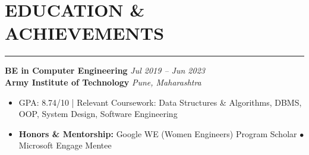 \documentclass[11pt,letterpaper]{article}
\newcommand{\sectionrule}{\vspace{-6pt}\hrule\vspace{3pt}}
\newcommand{\entryHeader}[4]{%
  \textbf{#1} \hfill \textit{#2}\\
  \textbf{#3} \hfill \textit{#4}
}
\newenvironment{entryList}{%
  \begin{itemize}[leftmargin=1.3em, itemsep=1.5pt, topsep=2pt, parsep=0pt]
}{%
  \end{itemize}\vspace{2pt}
}
\begin{document}
\section*{EDUCATION \& ACHIEVEMENTS}
\sectionrule

\entryHeader{BE in Computer Engineering}{Jul 2019 -- Jun 2023}{Army Institute of Technology}{Pune, Maharashtra}
\begin{entryList}
  \item GPA: 8.74/10 | Relevant Coursework: Data Structures \& Algorithms, DBMS, OOP, System Design, Software Engineering
  \item \textbf{Honors \& Mentorship:} Google WE (Women Engineers) Program Scholar $\bullet$ Microsoft Engage Mentee
\end{entryList}
\end{document}
